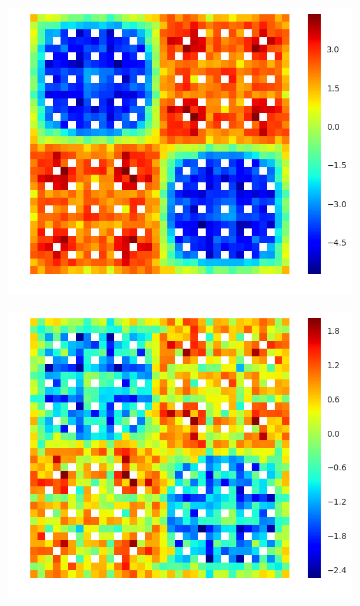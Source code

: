 \begin{figure}[h!]
\begin{subfigure}{.33\textwidth}
  \centering
  \includegraphics[width=\linewidth]{figures/quantification/2x2/degenerate-fiss-err-2}
  \caption{}
  \label{fig:chap8-2x2-degenerate-fiss-2}
\end{subfigure}%
\begin{subfigure}{.33\textwidth}
  \centering
  \includegraphics[width=\linewidth]{figures/quantification/2x2/degenerate-fiss-err-8}
  \caption{}
  \label{fig:chap8-2x2-degenerate-fiss-8}
\end{subfigure}%
\begin{subfigure}{.33\textwidth}

\end{subfigure}
\end{figure}

